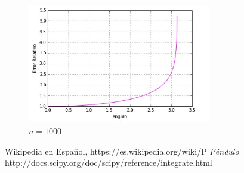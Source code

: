 \documentclass[12pt]{article}
\begin{document}
\begin{figure}[H]
	\centering
	\includegraphics[width=8cm]{1000.jpg}	
	\caption{$n=1000$}
\end{figure}


\begin{thebibliography}{9}
	
Wikipedia en Español, https://es.wikipedia.org/wiki/P%
	\emph{Péndulo}
	http://docs.scipy.org/doc/scipy/reference/integrate.html
	
	
		
\end{thebibliography}
\end{document}
